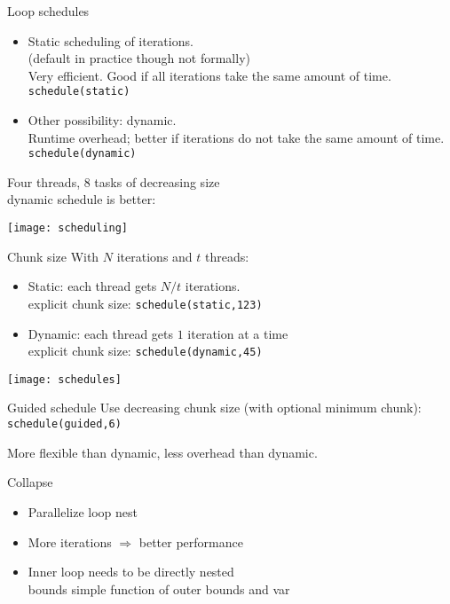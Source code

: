 \begin{numberedframe}{Loop schedules}
  \begin{itemize}
  \item Static scheduling of iterations. \\
    (default in practice though not formally)\\
    Very efficient. Good if all iterations take the same amount of
    time.\\ \texttt{schedule(static)}
  \item Other possibility: dynamic.\\
    Runtime overhead; better if iterations do not take the same amount
    of time.\\
    \texttt{schedule(dynamic)}
  \end{itemize}

  Four threads, 8 tasks of decreasing size\\
  dynamic schedule is better:
  
  \texttt{[image: scheduling]}
\end{numberedframe}

\begin{numberedframe}{Chunk size}
\small
  With $N$ iterations and $t$ threads:
  \begin{itemize}
  \item Static: each thread gets $N/t$ iterations.\\
    explicit chunk size: \texttt{schedule(static,123)}
  \item Dynamic: each thread gets $1$ iteration at a time\\
    explicit chunk size: \texttt{schedule(dynamic,45)}\\
  \end{itemize}
  \texttt{[image: schedules]}
\end{numberedframe}

\begin{numberedframe}{Guided schedule}
  Use decreasing chunk size (with optional minimum
  chunk): \texttt{schedule(guided,6)}

  More flexible than dynamic, less overhead than dynamic.    
\end{numberedframe}

\begin{numberedframe}{Collapse}
  \begin{itemize}
  \item Parallelize loop nest
  \item More iterations $\Rightarrow$ better performance
  \item Inner loop needs to be directly nested\\
    bounds simple function of outer bounds and var
  \end{itemize}
\end{numberedframe}

